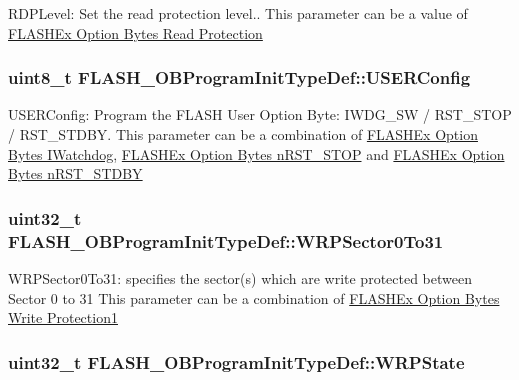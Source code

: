 R\-D\-P\-Level\-: Set the read protection level.. This parameter can be a value of \hyperlink{group___f_l_a_s_h_ex___option___bytes___read___protection}{F\-L\-A\-S\-H\-Ex Option Bytes Read Protection} \hypertarget{struct_f_l_a_s_h___o_b_program_init_type_def_ae6c9b55d49bc9627a2319ba680a924de}{
\subsubsection[{U\-S\-E\-R\-Config}]{\setlength{\rightskip}{0pt plus 5cm}uint8\-\_\-t F\-L\-A\-S\-H\-\_\-\-O\-B\-Program\-Init\-Type\-Def\-::\-U\-S\-E\-R\-Config}}\label{struct_f_l_a_s_h___o_b_program_init_type_def_ae6c9b55d49bc9627a2319ba680a924de}
U\-S\-E\-R\-Config\-: Program the F\-L\-A\-S\-H User Option Byte\-: I\-W\-D\-G\-\_\-\-S\-W / R\-S\-T\-\_\-\-S\-T\-O\-P / R\-S\-T\-\_\-\-S\-T\-D\-B\-Y. This parameter can be a combination of \hyperlink{group___f_l_a_s_h_ex___option___bytes___i_watchdog}{F\-L\-A\-S\-H\-Ex Option Bytes I\-Watchdog}, \hyperlink{group___f_l_a_s_h_ex___option___bytes__n_r_s_t___s_t_o_p}{F\-L\-A\-S\-H\-Ex Option Bytes n\-R\-S\-T\-\_\-\-S\-T\-O\-P} and \hyperlink{group___f_l_a_s_h_ex___option___bytes__n_r_s_t___s_t_d_b_y}{F\-L\-A\-S\-H\-Ex Option Bytes n\-R\-S\-T\-\_\-\-S\-T\-D\-B\-Y} \hypertarget{struct_f_l_a_s_h___o_b_program_init_type_def_a1ed8b83be8ebfcf9b42fff5577014642}{
\subsubsection[{W\-R\-P\-Sector0\-To31}]{\setlength{\rightskip}{0pt plus 5cm}uint32\-\_\-t F\-L\-A\-S\-H\-\_\-\-O\-B\-Program\-Init\-Type\-Def\-::\-W\-R\-P\-Sector0\-To31}}\label{struct_f_l_a_s_h___o_b_program_init_type_def_a1ed8b83be8ebfcf9b42fff5577014642}
W\-R\-P\-Sector0\-To31\-: specifies the sector(s) which are write protected between Sector 0 to 31 This parameter can be a combination of \hyperlink{group___f_l_a_s_h_ex___option___bytes___write___protection1}{F\-L\-A\-S\-H\-Ex Option Bytes Write Protection1} \hypertarget{struct_f_l_a_s_h___o_b_program_init_type_def_a2607ba046f7a3af46e7209b8f1e9e20d}{
\subsubsection[{W\-R\-P\-State}]{\setlength{\rightskip}{0pt plus 5cm}uint32\-\_\-t F\-L\-A\-S\-H\-\_\-\-O\-B\-Program\-Init\-Type\-Def\-::\-W\-R\-P\-State}}\label{struct_f_l_a_s_h___o_b_program_init_type_def_a2607ba046f7a3af46e7209b8f1e9e20d}
